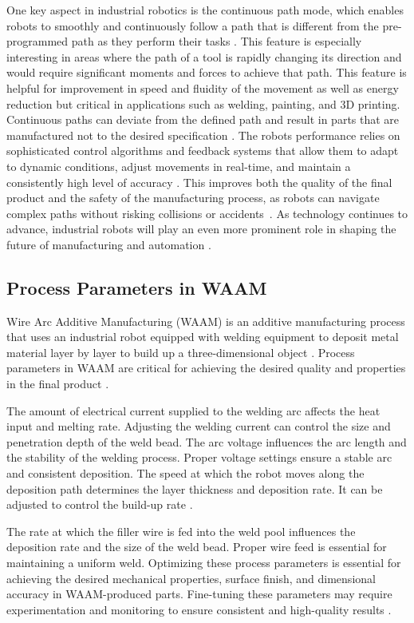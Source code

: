 \documentclass[ZLstudentexpose%
              ,optBiber%
              ,optEnglish%
              ,10pt
              ]{ZLlatex}%
\begin{document}
One key aspect in industrial robotics is the continuous path mode, which enables robots to smoothly and continuously follow a path that is different from the pre-programmed path as they perform their tasks \cite{Chen.2017}. This feature is especially interesting in areas where the path of a tool is rapidly changing its direction and would require significant moments and forces to achieve that path.
This feature is helpful for improvement in speed and fluidity of the movement as well as energy reduction but critical in applications such as welding, painting, and 3D printing. Continuous paths can deviate from the defined path and result in parts that are manufactured not to the desired specification \cite{Bigliardi.2023}. 
\newpage
The robots performance relies on sophisticated control algorithms and feedback systems that allow them to adapt to dynamic conditions, adjust movements in real-time, and maintain a consistently high level of accuracy \cite{Lin.2023}. This improves both the quality of the final product and the safety of the manufacturing process, as robots can navigate complex paths without risking collisions or accidents~\cite{Bosscher.2011}.
As technology continues to advance, industrial robots will play an even more prominent role in shaping the future of manufacturing and automation \cite{Domae.2019}.


\subsection{Process Parameters in WAAM}
Wire Arc Additive Manufacturing (WAAM) is an additive manufacturing process that uses an industrial robot equipped with welding equipment to deposit metal material layer by layer to build up a three-dimensional object \cite{Rodrigues.2019}. Process parameters in WAAM are critical for achieving the desired quality and properties in the final product \cite{Dinovitzer.2019}.

The amount of electrical current supplied to the welding arc affects the heat input and melting rate. Adjusting the welding current can control the size and penetration depth of the weld bead. The arc voltage influences the arc length and the stability of the welding process. Proper voltage settings ensure a stable arc and consistent deposition. The speed at which the robot moves along the deposition path determines the layer thickness and deposition rate. It can be adjusted to control the build-up rate \cite{Tomar.2022}.

The rate at which the filler wire is fed into the weld pool influences the deposition rate and the size of the weld bead. Proper wire feed is essential for maintaining a uniform weld. Optimizing these process parameters is essential for achieving the desired mechanical properties, surface finish, and dimensional accuracy in WAAM-produced parts. Fine-tuning these parameters may require experimentation and monitoring to ensure consistent and high-quality results \cite{Muller.2019}.
\end{document}
